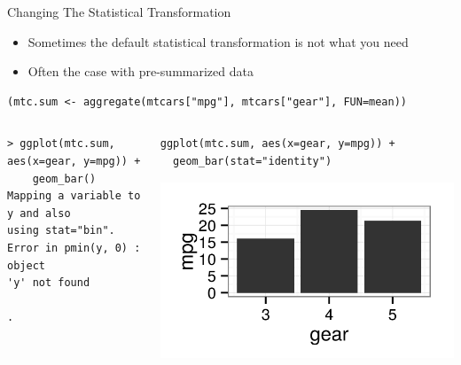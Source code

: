 \documentclass[table,smaller]{beamer}
\begin{document}
\begin{frame}[fragile,label=sec-3-3]{Changing The Statistical Transformation}
 \begin{itemize}
\item Sometimes the default statistical transformation is not what you need
\item Often the case with pre-summarized data
\end{itemize}
\begin{verbatim}
(mtc.sum <- aggregate(mtcars["mpg"], mtcars["gear"], FUN=mean))
\end{verbatim}

\begin{columns}
\begin{column}{0.5\textwidth}

\vspace{-.5em}
\begin{columns}
\begin{block}{}
\begin{verbatim}
> ggplot(mtc.sum, aes(x=gear, y=mpg)) + 
    geom_bar()
Mapping a variable to y and also 
using stat="bin".
Error in pmin(y, 0) : object 
'y' not found

.
\end{verbatim}
\end{block}
\end{columns}
\vspace{.5em}
\end{column}

\begin{column}{0.5\textwidth}

\begin{columns}  \begin{block}{}

\begin{verbatim}
ggplot(mtc.sum, aes(x=gear, y=mpg)) + 
  geom_bar(stat="identity")
\end{verbatim}

\includegraphics[width=.9\linewidth]{images/ChangeStat.png}

\end{block} \end{columns}
\end{column}
\end{columns}
\end{frame}
\end{document}
